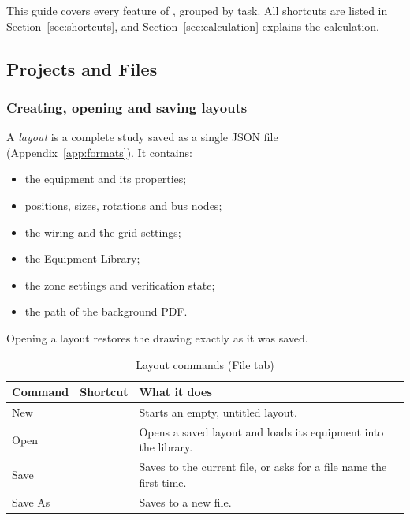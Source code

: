 This guide covers every feature of \app{}, grouped by task. All shortcuts are listed
in Section~\ref{sec:shortcuts}, and Section~\ref{sec:calculation} explains the
calculation.

\subsection{Projects and Files}\label{sec:files}

\subsubsection{Creating, opening and saving layouts}

A \emph{layout} is a complete study saved as a single JSON file
(Appendix~\ref{app:formats}). It contains:
\begin{itemize}
  \item the equipment and its properties;
  \item positions, sizes, rotations and bus nodes;
  \item the wiring and the grid settings;
  \item the Equipment Library;
  \item the zone settings and verification state;
  \item the path of the background PDF.
\end{itemize}
Opening a layout restores the drawing exactly as it was saved.

\begin{table}[H]
  \centering
  \caption{Layout commands (File tab)}
  \label{tab:filecommands}
  \begin{tabularx}{\textwidth}{l l L}
    \toprule
    \textbf{Command} & \textbf{Shortcut} & \textbf{What it does} \\
    \midrule
    New &  & Starts an empty, untitled layout. \\
    Open &  & Opens a saved layout and loads its equipment into the library. \\
    Save &  & Saves to the current file, or asks for a file name the first time. \\
    Save As &  & Saves to a new file. \\
    \bottomrule
  \end{tabularx}
\end{table}

